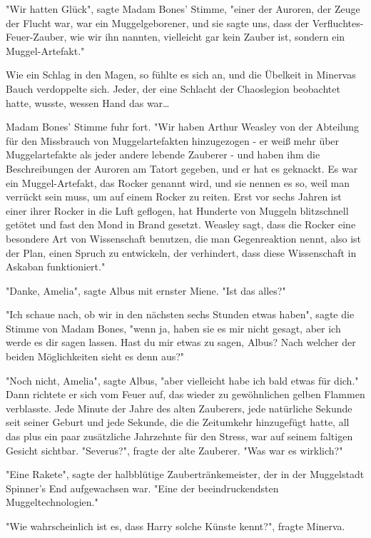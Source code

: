 {"Wir hatten Glück", sagte Madam Bones' Stimme, "einer der Auroren, der Zeuge der Flucht war, war ein Muggelgeborener, und sie sagte uns, dass der Verfluchtes-Feuer-Zauber, wie wir ihn nannten, vielleicht gar kein Zauber ist, sondern ein Muggel-Artefakt."

Wie ein Schlag in den Magen, so fühlte es sich an, und die Übelkeit in Minervas Bauch verdoppelte sich. Jeder, der eine Schlacht der Chaoslegion beobachtet hatte, wusste, wessen Hand das war…

Madam Bones' Stimme fuhr fort. "Wir haben Arthur Weasley von der Abteilung für den Missbrauch von Muggelartefakten hinzugezogen - er weiß mehr über Muggelartefakte als jeder andere lebende Zauberer - und haben ihm die Beschreibungen der Auroren am Tatort gegeben, und er hat es geknackt. Es war ein Muggel-Artefakt, das Rocker genannt wird, und sie nennen es so, weil man verrückt sein muss, um auf einem Rocker zu reiten. Erst vor sechs Jahren ist einer ihrer Rocker in die Luft geflogen, hat Hunderte von Muggeln blitzschnell getötet und fast den Mond in Brand gesetzt. Weasley sagt, dass die Rocker eine besondere Art von Wissenschaft benutzen, die man Gegenreaktion nennt, also ist der Plan, einen Spruch zu entwickeln, der verhindert, dass diese Wissenschaft in Askaban funktioniert."

"Danke, Amelia", sagte Albus mit ernster Miene. "Ist das alles?"

"Ich schaue nach, ob wir in den nächsten sechs Stunden etwas haben", sagte die Stimme von Madam Bones, "wenn ja, haben sie es mir nicht gesagt, aber ich werde es dir sagen lassen. Hast du mir etwas zu sagen, Albus? Nach welcher der beiden Möglichkeiten sieht es denn aus?"

"Noch nicht, Amelia", sagte Albus, "aber vielleicht habe ich bald etwas für dich." Dann richtete er sich vom Feuer auf, das wieder zu gewöhnlichen gelben Flammen verblasste. Jede Minute der Jahre des alten Zauberers, jede natürliche Sekunde seit seiner Geburt und jede Sekunde, die die Zeitumkehr hinzugefügt hatte, all das plus ein paar zusätzliche Jahrzehnte für den Stress, war auf seinem faltigen Gesicht sichtbar. "Severus?", fragte der alte Zauberer. "Was war es wirklich?"

"Eine Rakete", sagte der halbblütige Zaubertränkemeister, der in der Muggelstadt Spinner's End aufgewachsen war. "Eine der beeindruckendsten Muggeltechnologien."

"Wie wahrscheinlich ist es, dass Harry solche Künste kennt?", fragte Minerva.

}
